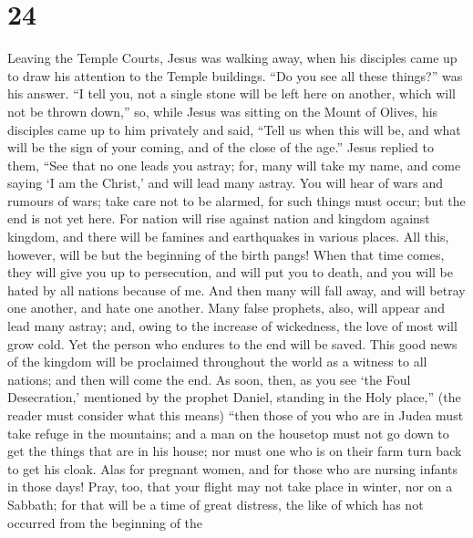 \hypertarget{section-23}{%
\section{24}\label{section-23}}

 Leaving the Temple Courts, Jesus was walking away, when his
disciples came up to draw his attention to the Temple buildings.
 ``Do you see all these things?'' was his answer. ``I tell
you, not a single stone will be left here on another, which will not be
thrown down,''  so, while Jesus was sitting on the Mount of
Olives, his disciples came up to him privately and said, ``Tell us when
this will be, and what will be the sign of your coming, and of the close
of the age.''  Jesus replied to them, ``See that no one
leads you astray;  for, many will take my name, and come
saying `I am the Christ,' and will lead many astray.  You
will hear of wars and rumours of wars; take care not to be alarmed, for
such things must occur; but the end is not yet here.  For
nation will rise against nation and kingdom against kingdom, and there
will be famines and earthquakes in various places.  All
this, however, will be but the beginning of the birth pangs!
 When that time comes, they will give you up to persecution,
and will put you to death, and you will be hated by all nations because
of me.  And then many will fall away, and will betray one
another, and hate one another.  Many false prophets, also,
will appear and lead many astray;  and, owing to the
increase of wickedness, the love of most will grow cold. 
Yet the person who endures to the end will be saved.  This
good news of the kingdom will be proclaimed throughout the world as a
witness to all nations; and then will come the end.  As
soon, then, as you see `the Foul Desecration,' mentioned by the prophet
Daniel, standing in the Holy place,'' (the reader must consider what
this means)  ``then those of you who are in Judea must take
refuge in the mountains;  and a man on the housetop must
not go down to get the things that are in his house;  nor
must one who is on their farm turn back to get his cloak. 
Alas for pregnant women, and for those who are nursing infants in those
days!  Pray, too, that your flight may not take place in
winter, nor on a Sabbath;  for that will be a time of great
distress, the like of which has not occurred from the beginning of the
